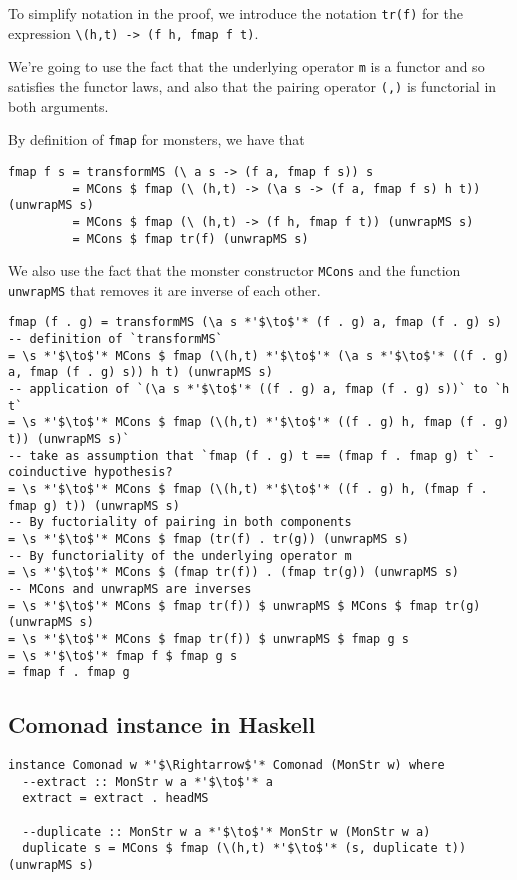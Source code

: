 \documentclass{article}
\begin{document}
To simplify notation in the proof, we introduce the notation \verb+tr(f)+ for the expression \verb+\(h,t) -> (f h, fmap f t)+.

We're going to use the fact that the underlying operator \verb+m+ is a functor and so satisfies the functor laws, and also that the pairing operator \verb+(,)+ is functorial in both arguments.

By definition of \verb+fmap+ for monsters, we have that
\begin{lstlisting}
fmap f s = transformMS (\ a s -> (f a, fmap f s)) s
         = MCons $ fmap (\ (h,t) -> (\a s -> (f a, fmap f s) h t)) (unwrapMS s)
         = MCons $ fmap (\ (h,t) -> (f h, fmap f t)) (unwrapMS s)
         = MCons $ fmap tr(f) (unwrapMS s)
\end{lstlisting}

We also use the fact that the monster constructor \verb+MCons+ and the function \verb+unwrapMS+ that removes it are inverse of each other.

\begin{lstlisting}
fmap (f . g) = transformMS (\a s *'$\to$'* (f . g) a, fmap (f . g) s)
-- definition of `transformMS`
= \s *'$\to$'* MCons $ fmap (\(h,t) *'$\to$'* (\a s *'$\to$'* ((f . g) a, fmap (f . g) s)) h t) (unwrapMS s)
-- application of `(\a s *'$\to$'* ((f . g) a, fmap (f . g) s))` to `h t`
= \s *'$\to$'* MCons $ fmap (\(h,t) *'$\to$'* ((f . g) h, fmap (f . g) t)) (unwrapMS s)`
-- take as assumption that `fmap (f . g) t == (fmap f . fmap g) t` - coinductive hypothesis?
= \s *'$\to$'* MCons $ fmap (\(h,t) *'$\to$'* ((f . g) h, (fmap f . fmap g) t)) (unwrapMS s)
-- By fuctoriality of pairing in both components
= \s *'$\to$'* MCons $ fmap (tr(f) . tr(g)) (unwrapMS s)
-- By functoriality of the underlying operator m
= \s *'$\to$'* MCons $ (fmap tr(f)) . (fmap tr(g)) (unwrapMS s)
-- MCons and unwrapMS are inverses
= \s *'$\to$'* MCons $ fmap tr(f)) $ unwrapMS $ MCons $ fmap tr(g) (unwrapMS s)
= \s *'$\to$'* MCons $ fmap tr(f)) $ unwrapMS $ fmap g s
= \s *'$\to$'* fmap f $ fmap g s
= fmap f . fmap g
\end{lstlisting}

\subsection{Comonad instance in Haskell}

\begin{lstlisting}
instance Comonad w *'$\Rightarrow$'* Comonad (MonStr w) where
  --extract :: MonStr w a *'$\to$'* a
  extract = extract . headMS
  
  --duplicate :: MonStr w a *'$\to$'* MonStr w (MonStr w a)
  duplicate s = MCons $ fmap (\(h,t) *'$\to$'* (s, duplicate t)) (unwrapMS s)
\end{lstlisting}
\end{document}
